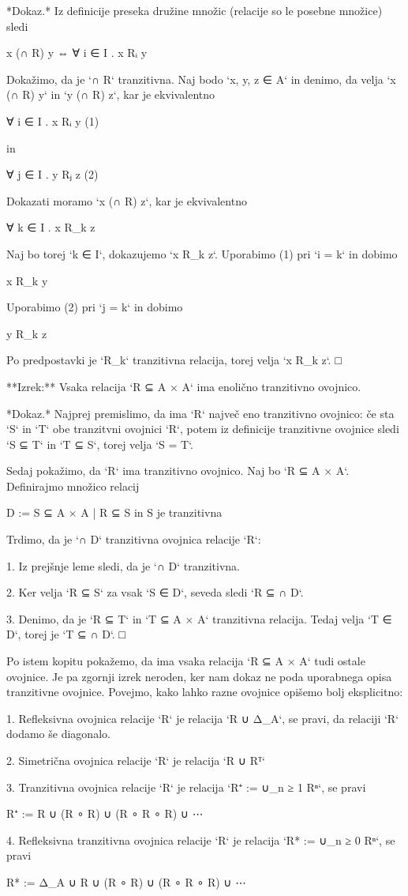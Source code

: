 *Dokaz.* Iz definicije preseka družine množic (relacije so le posebne množice) sledi

    x (∩ R) y ⇔ ∀ i ∈ I . x Rᵢ y

Dokažimo, da je `∩ R` tranzitivna. Naj bodo `x, y, z ∈ A` in denimo, da velja
`x (∩ R) y` in `y (∩ R) z`, kar je ekvivalentno

    ∀ i ∈ I . x Rᵢ y            (1)

in

    ∀ j ∈ I . y Rⱼ z            (2)

Dokazati moramo `x (∩ R) z`, kar je ekvivalentno

    ∀ k ∈ I . x R_k z

Naj bo torej `k ∈ I`, dokazujemo `x R_k z`. Uporabimo (1) pri `i = k` in dobimo

    x R_k y

Uporabimo (2) pri `j = k` in dobimo

    y R_k z

Po predpostavki je `R_k` tranzitivna relacija, torej velja `x R_k z`. □

**Izrek:** Vsaka relacija `R ⊆ A × A` ima enolično tranzitivno ovojnico.

*Dokaz.* Najprej premislimo, da ima `R` največ eno tranzitivno ovojnico: če sta
`S` in `T` obe tranzitvni ovojnici `R`, potem iz definicije tranzitivne ovojnice
sledi `S ⊆ T` in `T ⊆ S`, torej velja `S = T`.

Sedaj pokažimo, da `R` ima tranzitivno ovojnico. Naj bo `R ⊆ A × A`. Definirajmo
množico relacij

    D := { S ⊆ A × A | R ⊆ S in S je tranzitivna }

Trdimo, da je `∩ D` tranzitivna ovojnica relacije `R`:

1. Iz prejšnje leme sledi, da je `∩ D` tranzitivna.

2. Ker velja `R ⊆ S` za vsak `S ∈ D`, seveda sledi `R ⊆ ∩ D`.

3. Denimo, da je `R ⊆ T` in `T ⊆ A × A` tranzitivna relacija. Tedaj velja `T ∈
   D`, torej je `T ⊆ ∩ D`. □

Po istem kopitu pokažemo, da ima vsaka relacija `R ⊆ A × A` tudi ostale
ovojnice. Je pa zgornji izrek neroden, ker nam dokaz ne poda uporabnega opisa
tranzitivne ovojnice. Povejmo, kako lahko razne ovojnice opišemo bolj
eksplicitno:

1. Refleksivna ovojnica relacije `R` je relacija `R ∪ Δ_A`, se pravi, da
   relaciji `R` dodamo še diagonalo.

2. Simetrična ovojnica relacije `R` je relacija `R ∪ Rᵀ`

3. Tranzitivna ovojnica relacije `R` je relacija `R⁺ := ∪_{n ≥ 1} Rⁿ`, se pravi

        R⁺ := R ∪ (R ∘ R) ∪ (R ∘ R ∘ R) ∪ ⋯

4. Refleksivna tranzitivna ovojnica relacije `R` je relacija `R* := ∪_{n ≥ 0} Rⁿ`, se pravi

        R* := Δ_A ∪ R ∪ (R ∘ R) ∪ (R ∘ R ∘ R) ∪ ⋯
